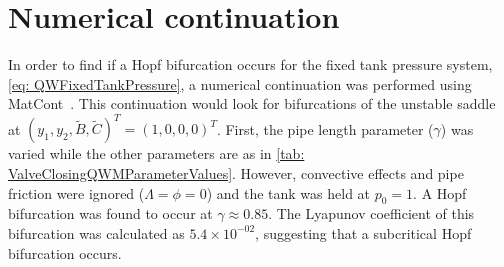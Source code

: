 \chapter{Numerical continuation} \label{sec: Continuation}

In order to find if a Hopf bifurcation occurs for the fixed tank pressure system, \cref{eq: QWFixedTankPressure}, a numerical continuation was performed using MatCont~\cite{Dhooge2003MATCONT}. This continuation would look for bifurcations of the unstable saddle at $(y_1,y_2,\tilde{B},\tilde{C})^T = (1,0,0,0)^T$. First, the pipe length parameter ($\gamma$) was varied while the other parameters are as in \cref{tab: ValveClosingQWMParameterValues}. However, convective effects and pipe friction were ignored ($\Lambda = \phi = 0$) and the tank was held at $p_0 = 1$. A Hopf bifurcation was found to occur at $\gamma \approx 0.85$.
The Lyapunov coefficient of this bifurcation was calculated as  $5.4 \times 10^{-02}$, suggesting that a subcritical Hopf bifurcation occurs.


